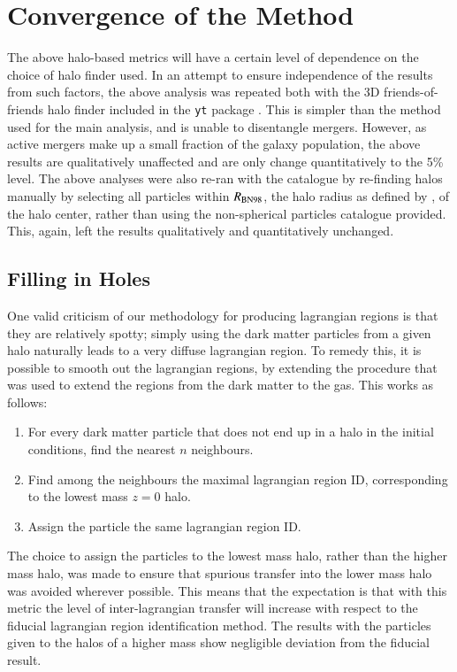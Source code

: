 \section{Convergence of the Method}
\label{sec:convergence}

The above halo-based metrics will have a certain level of dependence on the
choice of halo finder used. In an attempt to ensure independence of the results
from such factors, the above analysis was repeated both with the 3D
friends-of-friends halo finder included in the {\tt yt} package \citep{Turk2011}.
This is simpler than the \velociraptor{} method used for the main analysis, and
is unable to disentangle mergers. However, as active mergers make up a small
fraction of the galaxy population, the above results are qualitatively
unaffected and are only change quantitatively to the 5\% level. The above
analyses were also re-ran with the \velociraptor{} catalogue by re-finding
halos manually by selecting all particles within $R_{\rm BN98}$, the halo
radius as defined by \citet{Bryan1998}, of the halo center, rather than using
the non-spherical particles catalogue provided. This, again, left the results
qualitatively and quantitatively unchanged.


\subsection{Filling in Holes}


One valid criticism of our methodology for producing lagrangian regions is that
they are relatively spotty; simply using the dark matter particles from a given
halo naturally leads to a very diffuse lagrangian region. To remedy this, it is
possible to smooth out the lagrangian regions, by extending the procedure
that was used to extend the regions from the dark matter to the gas.
This works as follows:
\begin{enumerate}
	\item For every dark matter particle that does not end up in a halo 
	      in the initial conditions, find the nearest $n$ neighbours.
	\item Find among the neighbours the maximal lagrangian region ID,
	      corresponding to the lowest mass $z=0$ halo.
	\item Assign the particle the same lagrangian region ID.
\end{enumerate}
The choice to assign the particles to the lowest mass halo, rather than the
higher mass halo, was made to ensure that spurious transfer into the lower mass
halo was avoided wherever possible. This means that the expectation is that
with this metric the level of inter-lagrangian transfer will increase with
respect to the fiducial lagrangian region identification method. The results
with the particles given to the halos of a higher mass show negligible
deviation from the fiducial result.

